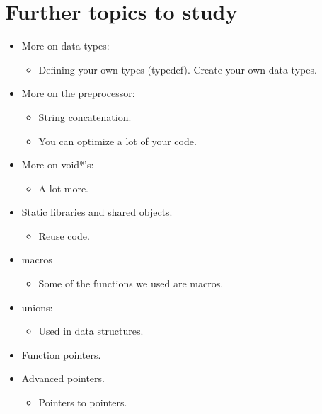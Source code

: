 \section{Further topics to study}
\begin{itemize}
    \item More on data types:
        \begin{itemize}
            \item Defining your own types (typedef). Create your own data types.
        \end{itemize}
    
    \item More on the preprocessor:
        \begin{itemize}
            \item String concatenation. 
            \item You can optimize a lot of your code.
        \end{itemize}
    
    \item More on void*'s:
        \begin{itemize}
            \item A lot more.
        \end{itemize}
    
    \item Static libraries and shared objects.
        \begin{itemize}
            \item Reuse code.
        \end{itemize}

    \item macros
        \begin{itemize}
            \item Some of the functions we used are macros.
        \end{itemize}
    
    \item unions:
        \begin{itemize}
            \item Used in data structures.
        \end{itemize}
    
    \item Function pointers.
    \item Advanced pointers.
        \begin{itemize}
            \item Pointers to pointers.
        \end{itemize}
    

\end{itemize}
